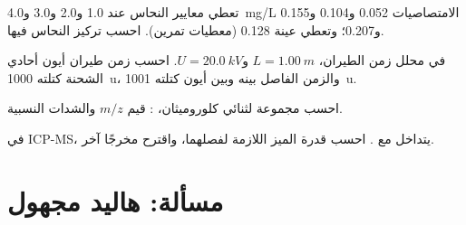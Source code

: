 \begin{exercise}[$\star\star$]\label{exo:b2:mass-spec-atomic:9}
تعطي معايير النحاس عند 1.0 و2.0 و3.0 و\qty{4.0}{mg/L} الامتصاصيات 0.052 و0.104 و0.155 و0.207؛
وتعطي عينة 0.128 (معطيات تمرين). احسب تركيز النحاس فيها.
\end{exercise}

\begin{exercise}[$\star\star\star$]\label{exo:b2:mass-spec-atomic:10}
في محلل زمن الطيران، $L = \qty{1.00}{m}$ و$U = \qty{20.0}{kV}$. احسب زمن طيران
أيون أحادي الشحنة كتلته \qty{1000}{u}، والزمن الفاصل بينه وبين أيون كتلته \qty{1001}{u}.
\end{exercise}

\begin{exercise}[$\star\star\star$]\label{exo:b2:mass-spec-atomic:11}
احسب مجموعة  لثنائي كلوروميثان، : قيم $m/z$ والشدات
النسبية.
\end{exercise}

\begin{exercise}[$\star\star\star$]\label{exo:b2:mass-spec-atomic:12}
في ICP-MS، يتداخل  مع . احسب قدرة الميز اللازمة
لفصلهما، واقترح مخرجًا آخر.
\end{exercise}

\section{مسألة: هاليد مجهول}

